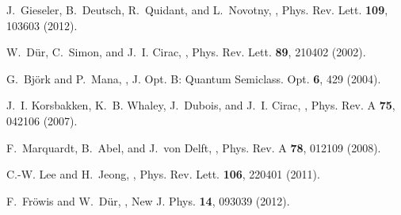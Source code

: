 \documentclass[11pt]{article}
\begin{document}
\begin{thebibliography}{100}
J.~Gieseler, B.~Deutsch, R.~Quidant, and L.~Novotny,
,
\newblock Phys. Rev. Lett. {\bf 109}, 103603 (2012).

W.~D\"ur, C.~Simon, and J.~I. Cirac,
,
\newblock Phys. Rev. Lett. {\bf 89}, 210402 (2002).

G.~Bj{\"o}rk and P.~Mana,
,
\newblock J. Opt. B: Quantum Semiclass. Opt. {\bf 6}, 429 (2004).

J.~I. Korsbakken, K.~B. Whaley, J.~Dubois, and J.~I. Cirac,
,
\newblock Phys. Rev. A {\bf 75}, 042106 (2007).

F.~Marquardt, B.~Abel, and J.~von Delft,
,
\newblock Phys. Rev. A {\bf 78}, 012109 (2008).

C.-W. Lee and H.~Jeong,
,
\newblock Phys. Rev. Lett. {\bf 106}, 220401 (2011).

F.~Fr\"{o}wis and W.~D\"{u}r,
,
\newblock New J. Phys. {\bf 14}, 093039 (2012).

\end{thebibliography}
\end{document}
